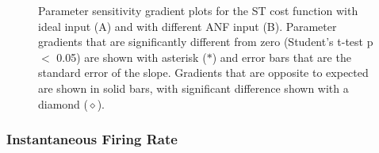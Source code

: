 % 
% 


\begin{figure}[th]
  \centering
  \caption{Parameter sensitivity gradient plots for the ST cost
    function with ideal input (A) and with different {ANF} input
    (B). Parameter gradients that are significantly different from
    zero (Student's t-test p $<$ 0.05) are shown with asterisk
    ($\ast$) and error bars that are the standard error of the
    slope. Gradients that are opposite to expected are shown in
    solid bars, with significant difference shown with a diamond
    ($\diamond$).}
  \label{fig:GA:13}
\end{figure}

\subsubsection{Instantaneous Firing Rate}

